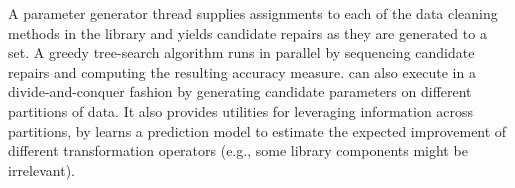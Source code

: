 A parameter generator thread supplies assignments to each of the data cleaning methods in the library and yields candidate repairs as they are generated to a set.  A greedy tree-search algorithm runs in parallel by sequencing candidate repairs and computing the resulting accuracy measure.  \sys can also execute in a divide-and-conquer fashion by generating candidate parameters on different partitions of data.  It also provides utilities for leveraging information across partitions, by learns a prediction model to estimate the expected improvement of different transformation operators (e.g., some library components might be irrelevant).  

